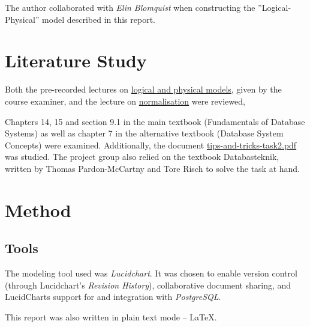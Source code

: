 \documentclass[a4paper]{scrartcl}
\begin{document}
The author collaborated with
\emph{Elin Blomquist}
when constructing the ''Logical-Physical'' model described in this report.


\section{Literature Study}
Both the pre-recorded lectures on
\href{https://canvas.kth.se/courses/43013/pages/logical-and-physical-models}{logical and physical models},
given by the course examiner, and the lecture on
\href{https://canvas.kth.se/courses/43013/pages/normalisation}{normalisation} were reviewed,

Chapters 14, 15 and section 9.1 in the main textbook
(Fundamentals of Database Systems) as well as chapter 7 in the
alternative textbook (Database System Concepts) were examined.
Additionally, the document
\href{https://canvas.kth.se/courses/43013/files/7096103?wrap=1}{tips-and-tricks-task2.pdf}
was studied.
The project group also relied on the textbook Databasteknik, written by
Thomas Pardon-McCartny and Tore Risch to solve the task at hand.

\clearpage
\section{Method}
\label{sec:method}


\subsection*{Tools}
The modeling tool used was \emph{Lucidchart}.
It was chosen to enable version control (through Lucidchart's \emph{Revision History}),
collaborative document sharing, and LucidCharts support for and integration with
\emph{PostgreSQL}.

This report was also written in plain text mode -- \LaTeX.
\end{document}
